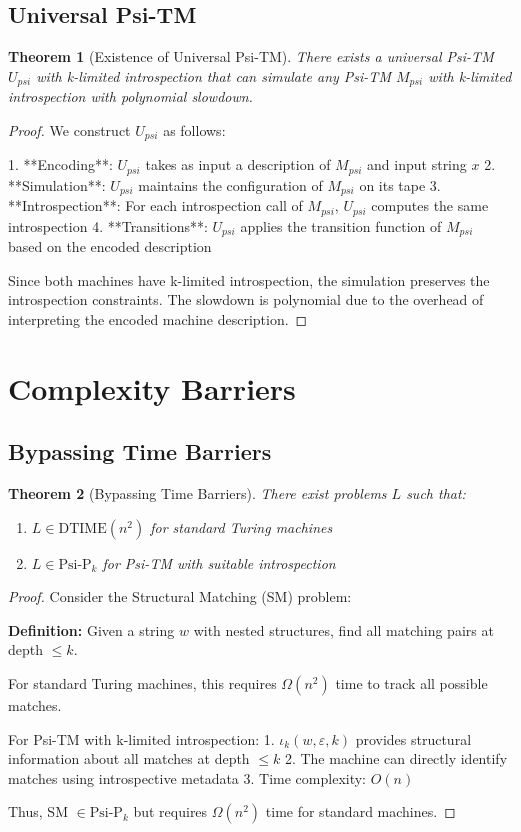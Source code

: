 \documentclass[11pt]{article}
\newtheorem{theorem}{Theorem}
\begin{document}
\subsection{Universal Psi-TM}

\begin{theorem}[Existence of Universal Psi-TM]
There exists a universal Psi-TM $U_{psi}$ with k-limited introspection that can simulate any Psi-TM $M_{psi}$ with k-limited introspection with polynomial slowdown.
\end{theorem}

\begin{proof}
We construct $U_{psi}$ as follows:

1. **Encoding**: $U_{psi}$ takes as input a description of $M_{psi}$ and input string $x$
2. **Simulation**: $U_{psi}$ maintains the configuration of $M_{psi}$ on its tape
3. **Introspection**: For each introspection call of $M_{psi}$, $U_{psi}$ computes the same introspection
4. **Transitions**: $U_{psi}$ applies the transition function of $M_{psi}$ based on the encoded description

Since both machines have k-limited introspection, the simulation preserves the introspection constraints. The slowdown is polynomial due to the overhead of interpreting the encoded machine description.
\end{proof}

\section{Complexity Barriers}

\subsection{Bypassing Time Barriers}

\begin{theorem}[Bypassing Time Barriers]
There exist problems $L$ such that:
\begin{enumerate}
\item $L \in \text{DTIME}(n^2)$ for standard Turing machines
\item $L \in \text{Psi-P}_k$ for Psi-TM with suitable introspection
\end{enumerate}
\end{theorem}

\begin{proof}
Consider the Structural Matching (SM) problem:

\textbf{Definition:} Given a string $w$ with nested structures, find all matching pairs at depth $\leq k$.

For standard Turing machines, this requires $\Omega(n^2)$ time to track all possible matches.

For Psi-TM with k-limited introspection:
1. $\iota_k(w, \varepsilon, k)$ provides structural information about all matches at depth $\leq k$
2. The machine can directly identify matches using introspective metadata
3. Time complexity: $O(n)$

Thus, SM $\in \text{Psi-P}_k$ but requires $\Omega(n^2)$ time for standard machines.
\end{proof}
\end{document}

